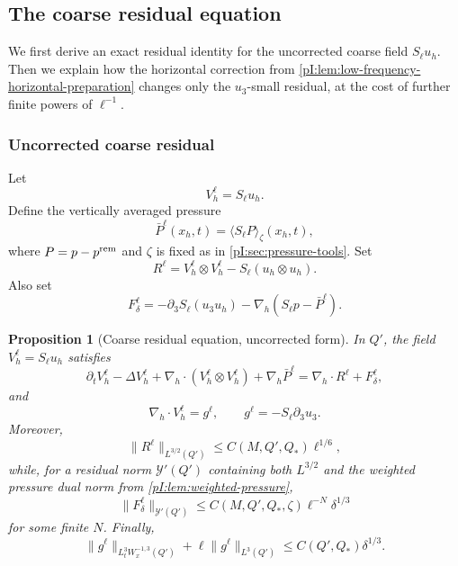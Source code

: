 \documentclass[11pt]{article}
\numberwithin{equation}{section}
\theoremstyle{plain}
\newtheorem{proposition}{Proposition}[section]
\theoremstyle{definition}
\theoremstyle{remark}
\newcommand{\nabh}{\nabla_h}
\newcommand{\divh}{\nabla_h\!\cdot}
\newcommand{\calY}{\mathcal Y}
\begin{document}
\subsection{The coarse residual equation}\label{pI:sec:coarse-residual}

We first derive an exact residual identity for the uncorrected coarse field \(S_\ell u_h\).  Then we explain how the horizontal correction from \cref{pI:lem:low-frequency-horizontal-preparation} changes only the \(u_3\)-small residual, at the cost of further finite powers of \(\ell^{-1}\).

\subsubsection{Uncorrected coarse residual}

Let
\[
        V_h^\ell=S_\ell u_h.
\]
Define the vertically averaged pressure
\begin{equation}\label{pI:eq:Pbar-def}
        \bar P^\ell(x_h,t)=\langle S_\ell P\rangle_\zeta(x_h,t),
\end{equation}
where \(P=p-p^{\rm rem}\) and \(\zeta\) is fixed as in \cref{pI:sec:pressure-tools}.  Set
\begin{equation}\label{pI:eq:Rell-def}
        R^\ell=V_h^\ell\otimes V_h^\ell-S_\ell(u_h\otimes u_h).
\end{equation}
Also set
\begin{equation}\label{pI:eq:Fdelta-def}
        F_\delta^\ell
        =-\partial_3S_\ell(u_3u_h)
        -\nabh(S_\ell p-\bar P^\ell).
\end{equation}

\begin{proposition}[Coarse residual equation, uncorrected form]\label{pI:prop:coarse-residual-uncorrected}
In \(Q'\), the field \(V_h^\ell=S_\ell u_h\) satisfies
\begin{equation}\label{pI:eq:coarse-residual-uncorrected}
        \partial_tV_h^\ell-\Delta V_h^\ell
        +\divh(V_h^\ell\otimes V_h^\ell)
        +\nabh\bar P^\ell
        =\divh R^\ell+F_\delta^\ell,
\end{equation}
and
\begin{equation}\label{pI:eq:gell-def}
        \divh V_h^\ell=g^\ell,
        \qquad
        g^\ell=-S_\ell\partial_3u_3.
\end{equation}
Moreover,
\begin{equation}\label{pI:eq:Rell-bound}
        \|R^\ell\|_{L^{3/2}(Q')}
        \le C(M,Q',Q_*)\ell^{1/6},
\end{equation}
while, for a residual norm \(\calY'(Q')\) containing both \(L^{3/2}\) and the weighted pressure dual norm from \cref{pI:lem:weighted-pressure},
\begin{equation}\label{pI:eq:Fdelta-bound}
        \|F_\delta^\ell\|_{\calY'(Q')}
        \le C(M,Q',Q_*,\zeta)\ell^{-N}\delta^{1/3}
\end{equation}
for some finite \(N\).  Finally,
\begin{equation}\label{pI:eq:gell-bound}
        \|g^\ell\|_{L^3_tW^{-1,3}_x(Q')}
        +\ell\|g^\ell\|_{L^3(Q')}
        \le C(Q',Q_*)\delta^{1/3}.
\end{equation}
\end{proposition}
\end{document}
